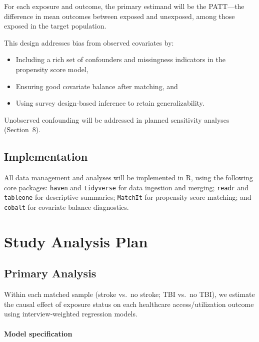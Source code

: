 \documentclass{article}
\begin{document}
For each exposure and outcome, the primary estimand will be the PATT---the difference in mean outcomes between exposed and unexposed, among those exposed in the target population.

This design addresses bias from observed covariates by:

\begin{itemize}
    \item Including a rich set of confounders and missingness indicators in the propensity score model,

    \item Ensuring good covariate balance after matching, and

    \item Using survey design-based inference to retain generalizability.

\end{itemize}

Unobserved confounding will be addressed in planned sensitivity analyses (Section~8).

\subsection{Implementation}

All data management and analyses will be implemented in R, using the following core packages: \texttt{haven} and \texttt{tidyverse} for data ingestion and merging; \texttt{readr} and \texttt{tableone} for descriptive summaries; \texttt{MatchIt} for propensity score matching; and \texttt{cobalt} for covariate balance diagnostics.


\section{Study Analysis Plan}

\subsection{Primary Analysis}

Within each matched sample (stroke vs.\ no stroke; TBI vs.\ no TBI), we estimate the causal effect of exposure status on each healthcare access/utilization outcome using interview-weighted regression models.

\paragraph{Model specification}
\end{document}
